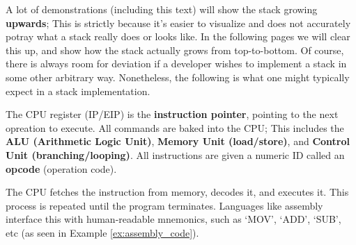 \begin{Tip}
A lot of demonstrations (including this text) will show the stack growing \textbf{upwards}; This is strictly because it's easier to visualize and does not
accurately potray what a stack really does or looks like. In the following pages we will clear this up, and show how the stack actually grows from top-to-bottom.
Of course, there is always room for deviation if a developer wishes to implement a stack in some other arbitrary way. Nonetheless, the following is what one 
might typically expect in a stack implementation.
\end{Tip}

\newpage 
\begin{Def}[Instructions]

    The CPU register (IP/EIP) is the \textbf{instruction pointer}, pointing to the next opreation to execute. All commands are baked 
    into the CPU; This includes the \textbf{ALU (Arithmetic Logic Unit)}, \textbf{Memory Unit (load/store)}, and \textbf{Control Unit (branching/looping)}.
    All instructions are given a numeric ID called an \textbf{opcode} (operation code). 
    
    The CPU fetches the instruction from memory, decodes it, and executes it. This process is repeated until the program terminates.
    Languages like assembly interface this with human-readable mnemonics, such as `MOV', `ADD', `SUB', etc (as seen in Example \ref{ex:assembly_code}).
    
\end{Def}
